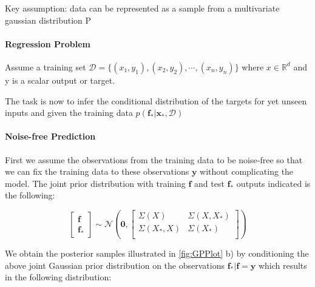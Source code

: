 Key assumption: data can be represented as a sample from a multivariate gaussian distribution
P

\paragraph{Regression Problem}
Assume a training set $\mathcal{D} = \{(x_{1},y_{1}), (x_{2},y_{2}), \cdots, (x_{n},y_{n})\}$ where $x \in \mathbb{R}^{d}$ and y is a scalar output or target. 

The task is now to infer the conditional distribution of the targets for yet unseen inputs and given the training data $p(\textbf{f}_{*}\vert \textbf{x}_{*},
\mathcal{D})$

\paragraph{Noise-free Prediction}
First we assume the observations from the training data to be noise-free so that we can fix the training data to these observations $\textbf{y}$ without complicating the model. The joint prior distribution with training $\textbf{f}$ and test $\textbf{f}_{*}$ outputs indicated is the following:

\begin{equation}
\begin{bmatrix}\textbf{f}\\\textbf{f}_{*}\end{bmatrix}
\sim \mathcal{N}\left(\textbf{0},
\begin{bmatrix}
    \Sigma(X) & \Sigma(X,X_{*})\\
    \Sigma(X_{*},X) & \Sigma(X_{*})\\
\end{bmatrix}
\right)
\end{equation}

We obtain the posterior samples illustrated in \ref{fig:GPPlot} b) by conditioning the above joint Gaussian prior distribution on the observations $\textbf{f}_{*}\vert\textbf{f}=\textbf{y}$ which results in the following distribution:

